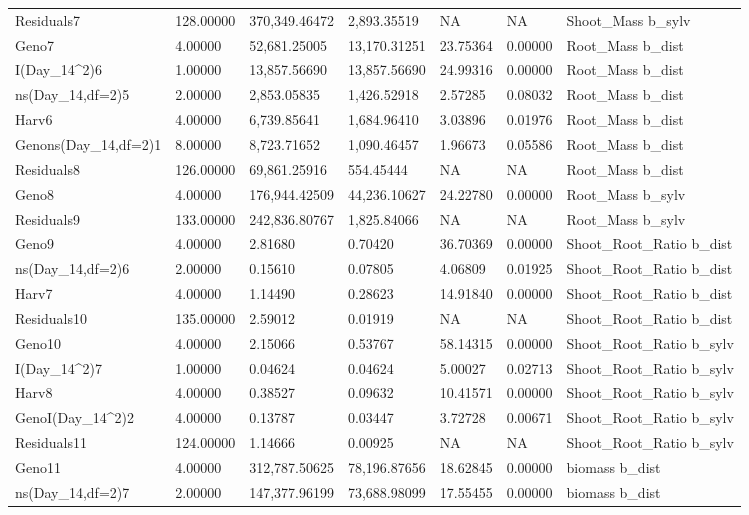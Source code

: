\documentclass[jou,floatsintext]{apa6}
\begin{document}
\begin{table}[tbp]
\begin{center}
\begin{threeparttable}
{\begin{tabular}{lllllll}
Residuals7 & 128.00000 & 370,349.46472 & 2,893.35519 & NA & NA & Shoot\_Mass b\_sylv\\
Geno7 & 4.00000 & 52,681.25005 & 13,170.31251 & 23.75364 & 0.00000 & Root\_Mass b\_dist\\
I(Day\_14\textasciicircum{}2)6 & 1.00000 & 13,857.56690 & 13,857.56690 & 24.99316 & 0.00000 & Root\_Mass b\_dist\\
ns(Day\_14,df=2)5 & 2.00000 & 2,853.05835 & 1,426.52918 & 2.57285 & 0.08032 & Root\_Mass b\_dist\\
Harv6 & 4.00000 & 6,739.85641 & 1,684.96410 & 3.03896 & 0.01976 & Root\_Mass b\_dist\\
Genons(Day\_14,df=2)1 & 8.00000 & 8,723.71652 & 1,090.46457 & 1.96673 & 0.05586 & Root\_Mass b\_dist\\
Residuals8 & 126.00000 & 69,861.25916 & 554.45444 & NA & NA & Root\_Mass b\_dist\\
Geno8 & 4.00000 & 176,944.42509 & 44,236.10627 & 24.22780 & 0.00000 & Root\_Mass b\_sylv\\
Residuals9 & 133.00000 & 242,836.80767 & 1,825.84066 & NA & NA & Root\_Mass b\_sylv\\
Geno9 & 4.00000 & 2.81680 & 0.70420 & 36.70369 & 0.00000 & Shoot\_Root\_Ratio b\_dist\\
ns(Day\_14,df=2)6 & 2.00000 & 0.15610 & 0.07805 & 4.06809 & 0.01925 & Shoot\_Root\_Ratio b\_dist\\
Harv7 & 4.00000 & 1.14490 & 0.28623 & 14.91840 & 0.00000 & Shoot\_Root\_Ratio b\_dist\\
Residuals10 & 135.00000 & 2.59012 & 0.01919 & NA & NA & Shoot\_Root\_Ratio b\_dist\\
Geno10 & 4.00000 & 2.15066 & 0.53767 & 58.14315 & 0.00000 & Shoot\_Root\_Ratio b\_sylv\\
I(Day\_14\textasciicircum{}2)7 & 1.00000 & 0.04624 & 0.04624 & 5.00027 & 0.02713 & Shoot\_Root\_Ratio b\_sylv\\
Harv8 & 4.00000 & 0.38527 & 0.09632 & 10.41571 & 0.00000 & Shoot\_Root\_Ratio b\_sylv\\
GenoI(Day\_14\textasciicircum{}2)2 & 4.00000 & 0.13787 & 0.03447 & 3.72728 & 0.00671 & Shoot\_Root\_Ratio b\_sylv\\
Residuals11 & 124.00000 & 1.14666 & 0.00925 & NA & NA & Shoot\_Root\_Ratio b\_sylv\\
Geno11 & 4.00000 & 312,787.50625 & 78,196.87656 & 18.62845 & 0.00000 & biomass b\_dist\\
ns(Day\_14,df=2)7 & 2.00000 & 147,377.96199 & 73,688.98099 & 17.55455 & 0.00000 & biomass b\_dist\\

\end{tabular}}
\end{threeparttable}
\end{center}
\end{table}
\end{document}
